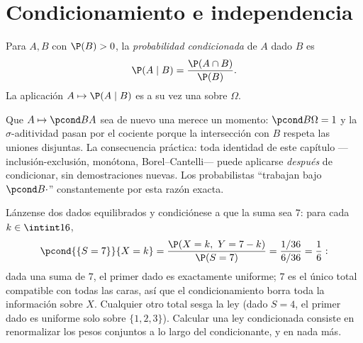 \section{Condicionamiento e independencia}

\begin{definition}\label{def:b2:proba:conditional}
Para  $A, B$ con $\P(B) > 0$, la \emph{probabilidad
condicionada} de $A$ dado $B$ es
\[
\P(A \mid B) = \frac{\P(A \cap B)}{\P(B)} .
\]
La aplicación $A \mapsto \P(A \mid B)$ es a su vez una
 sobre $\Omega$.
\end{definition}

\begin{remark}
Que $A \mapsto \pcond BA$ sea de nuevo una 
merece un momento: $\pcond B\Omega = 1$ y la $\sigma$-aditividad
pasan por el cociente porque la intersección con $B$ respeta las
uniones disjuntas. La consecuencia práctica: toda identidad de este
capítulo ---inclusión-exclusión,  monótona,
Borel--Cantelli--- puede aplicarse \emph{después} de condicionar, sin
demostraciones nuevas. Los probabilistas ``trabajan bajo $\pcond
B{\cdot}$'' constantemente por esta razón exacta.
\end{remark}

\begin{example}\label{ex:b2:proba:sumseven}
Lánzense dos dados equilibrados y condiciónese a que la suma sea $7$:
para cada $k \in \intint16$,
\[
\pcond{\{S = 7\}}{X = k}
= \frac{\P(X = k,\ Y = 7 - k)}{\P(S = 7)}
= \frac{1/36}{6/36} = \frac16 :
\]
dada una suma de $7$, el primer dado es exactamente uniforme; $7$ es
el único total compatible con todas las caras, así que el
condicionamiento borra toda la información sobre $X$. Cualquier otro
total sesga la ley (dado $S = 4$, el primer dado es uniforme solo
sobre $\{1, 2, 3\}$). Calcular una ley condicionada consiste en
renormalizar los pesos conjuntos a lo largo del 
condicionante, y en nada más.
\end{example}

